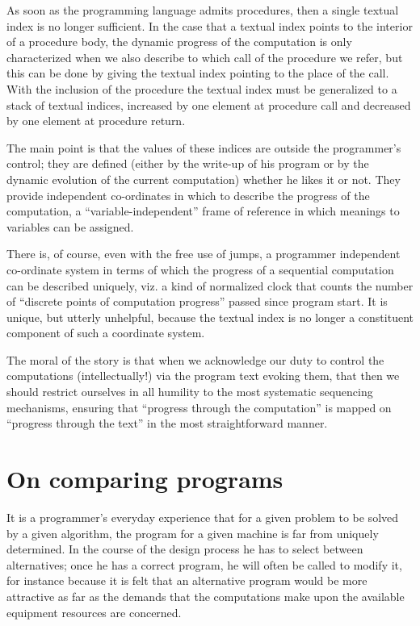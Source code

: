 As soon as the programming language admits procedures, then a single textual index is no longer sufficient. In the case that a textual index points to the interior of a procedure body, the dynamic progress of the computation is only characterized when we also describe to which call of the procedure we refer, but this can be done by giving the textual index pointing to the place of the call. With the inclusion of the procedure the textual index must be generalized to a stack of textual indices, increased by one element at procedure call and decreased by one element at procedure return.

The main point is that the values of these indices are outside the programmer's control; they are defined (either by the write-up of his program or by the dynamic evolution of the current computation) whether he likes it or not. They provide independent co-ordinates in which to describe the progress of the computation, a ``variable-independent'' frame of reference in which meanings to variables can be assigned.

There is, of course, even with the free use of jumps, a programmer independent co-ordinate system in terms of which the progress of a sequential computation can be described uniquely, viz. a kind of normalized clock that counts the number of ``discrete points of computation progress'' passed since program start. It is unique, but utterly unhelpful, because the textual index is no longer a constituent component of such a coordinate system.

The moral of the story is that when we acknowledge our duty to control the computations (intellectually!) via the program text evoking them, that then we should restrict ourselves in all humility to the most systematic sequencing mechanisms, ensuring that ``progress through the computation'' is mapped on ``progress through the text'' in the most straightforward manner.

\section{On comparing programs}
\label{sec:comparing-programs}

It is a programmer's everyday experience that for a given problem to be solved by a given algorithm, the program for a given machine is far from uniquely determined. In the course of the design process he has to select between alternatives; once he has a correct program, he will often be called to modify it, for instance because it is felt that an alternative program would be more attractive as far as the demands that the computations make upon the available equipment resources are concerned.

